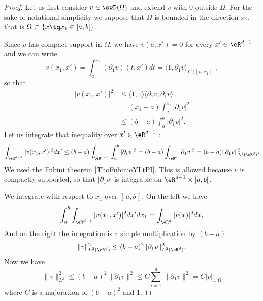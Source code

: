 \begin{proof}
Let us first consider \( v\in\swD(\Omega)\) and extend \( v\) with \( 0\) outside \( \Omega\). For the sake of notational simplicity we suppose that \( \Omega\) is bounded in the direction \( x_1\), that is \( \Omega\subset \{ x\tq x_1\in \mathopen] a , b \mathclose[ \}\).

Since \( v\) has compact support in \( \Omega\), we have \( v(a,x')=0\) for every \( x'\in \eR^{d-1}\) and we can write 
    \begin{equation}
    v(x_1,x')=   \int_a^{x_1}(\partial_1v)(t,x')dt=\langle 1, \partial_1v\rangle_{L^2\big( \mathopen] a , x_1 \mathclose[ \big)},
    \end{equation}
    so that
    \begin{subequations}
        \begin{align}
            | v(x_1,x') |^2&\leq \langle 1, 1\rangle \langle \partial_1v, \partial_1v\rangle \\
            &=(x_1-a)\int_a^{x_1}| \partial_1 v|^2\\
            &\leq(b-a)\int_a^b| \partial_1v |^2.
        \end{align}
    \end{subequations}
    Let us integrate that inequality over \( x'\in \eR^{d-1}\) :
    \begin{equation}
        \int_{\eR^{d-1}}| v(x_1,x') |^2dx'\leq (b-a)\int_{\eR^{d-1}}\int_a^b| \partial_1v |^2=(b-a)\int_{\eR^d}| \partial_1v |^2=(b-a)\| \partial_1v \|^2_{L^2(\eR^d)}.
    \end{equation}
    We used the Fubini theorem \ref{ThoFubinioYLtPI}. This is allowed because \( v\) is compactly supported, so that \( | \partial_1v |\) is integrable on \( \eR^{d-1}\times \mathopen] a , b \mathclose[\).

    We integrate with respect to \( x_1\) over \( \mathopen] a , b \mathclose[\). On the left we have
        \begin{equation}
            \int_a^b\int_{\eR^{d-1}}| v(x_1,x') |^2dx'dx_1=\int_{\eR^d}| v(x) |^2dx,
        \end{equation}  
        And on the right the integration is a simple multiplication by \( (b-a)\) :
        \begin{equation}
            \| v \|^2_{L^2(\eR^d)}\leq (b-a)^2\| \partial_1v \|^2_{L^2(\eR^d)}.
        \end{equation}
        Now we have
        \begin{equation}
            \| v \|^2_{L^2}\leq (b-a)^2\| \partial_1v \|^2\leq C\sum_{i=1}^d\| \partial_1v \|^2=C| v |_{1,\Omega}
        \end{equation}
        where \( C\) is a majoration of \( (b-a)^2\) and \( 1\).


\end{proof}
